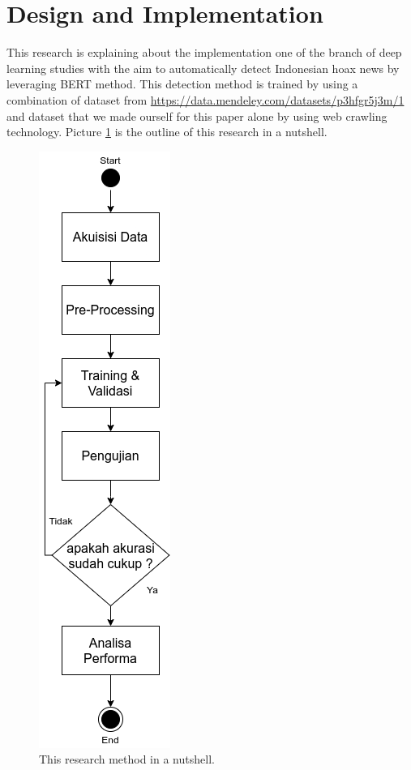 \section{Design and Implementation}
\label{sec:designandimplementation}

This research is explaining about the implementation one of the branch of deep learning studies with the aim to automatically detect Indonesian hoax news by leveraging BERT method. This detection method is trained by using a combination of dataset from \url{https://data.mendeley.com/datasets/p3hfgr5j3m/1} and dataset that we made ourself for this paper alone by using web crawling technology. Picture \ref{fig:metodologi} is the outline of this research in a nutshell.

\begin{figure} [h!]
    \centering
    \includegraphics[width=0.3\columnwidth]{gambar/metodologi_vertical.png}
    \caption{This research method in a nutshell.}
    \label{fig:metodologi}
\end{figure}

